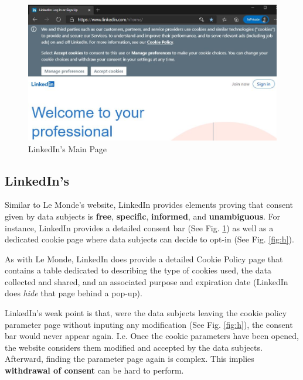 \documentclass[twocolumn, letterpaper]{scrartcl}
\begin{document}
        \begin{figure}[tbp]	
        \includegraphics[width=0.95\linewidth]{ld_website.JPG}
        \caption{LinkedIn's Main Page \label{fig:g}}
        \end{figure}
        
	\subsection*{LinkedIn's}
	    
	    Similar to Le Monde's website, LinkedIn provides elements proving that consent given by data subjects is \textbf{free}, \textbf{specific}, \textbf{informed}, and \textbf{unambiguous}. For instance, LinkedIn provides a detailed consent bar (See Fig. \ref{fig:g}) as well as a dedicated cookie page where data subjects can decide to opt-in (See Fig. \ref{fig:h}).
        
	    As with Le Monde, LinkedIn does provide a detailed Cookie Policy page that contains a table dedicated to describing the type of cookies used, the data collected and shared, and an associated purpose and expiration date (LinkedIn does \textit{hide} that page behind a pop-up).
	    
	    LinkedIn's weak point is that, were the data subjects leaving the cookie policy parameter page without inputing any modification (See Fig. \ref{fig:h}), the consent bar would never appear again. I.e. Once the cookie parameters have been opened, the website considers them modified and accepted by the data subjects. Afterward, finding the parameter page again is complex. This implies \textbf{withdrawal of consent} can be hard to perform.
\end{document}
